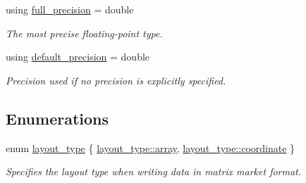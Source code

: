 \begin{DoxyCompactItemize}
using \hyperlink{namespacegko_ae3257beda99ac9180b501912be5caa5f}{full\+\_\+precision} = double
\begin{DoxyCompactList}\small\item\em The most precise floating-\/point type. \end{DoxyCompactList}\item 
\mbox{\label{namespacegko_a1d44e117d2f74b34bdc83ac5c0c6b605}} 
using \hyperlink{namespacegko_a1d44e117d2f74b34bdc83ac5c0c6b605}{default\+\_\+precision} = double
\begin{DoxyCompactList}\small\item\em Precision used if no precision is explicitly specified. \end{DoxyCompactList}\end{DoxyCompactItemize}
\subsection*{Enumerations}
\begin{DoxyCompactItemize}
\item 
enum \hyperlink{namespacegko_ae749a5ea11a93c1bcc9158d9a6e9fb68}{layout\+\_\+type} \{ \hyperlink{namespacegko_ae749a5ea11a93c1bcc9158d9a6e9fb68af1f713c9e000f5d3f280adbd124df4f5}{layout\+\_\+type\+::array}, 
\hyperlink{namespacegko_ae749a5ea11a93c1bcc9158d9a6e9fb68af5d7aa3ba4929cc12dc51a92c59fabd3}{layout\+\_\+type\+::coordinate}
 \}\begin{DoxyCompactList}\small\item\em Specifies the layout type when writing data in matrix market format. \end{DoxyCompactList}
\end{DoxyCompactItemize}
